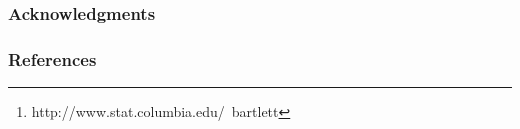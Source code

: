 \documentclass{article}
\title{}
\author{
David Pfau \\
Center for Theoretical Neuroscience \\
Columbia University\\
New York, NY 10027, USA \\
\texttt{pfau@neurotheory.columbia.edu} \\
\AND
Nicholas Bartlett\thanks{ http://www.stat.columbia.edu/~bartlett} \\
Department of Statistics\\
Columbia University\\
New York, NY 10027, USA \\
\texttt{bartlett@stat.columbia.edu} \\
\And
Frank Wood \\
Department of Statistics\\
Columbia University\\
New York, NY 10027, USA \\
\texttt{fwood@stat.columbia.edu} \\
}
\begin{document}
\makeanontitle















\subsubsection*{Acknowledgments}

\subsubsection*{References}
\begin{small}

 
%
\end{small}
\end{document}
